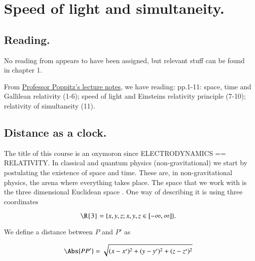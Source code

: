 %
%

\chapter{Speed of light and simultaneity.}
\label{chap:relativisticElectrodynamicsL1}
{}
\date{Jan 11, 2011}

\beginArtNoToc

\section{Reading.}

No reading from \citep{landau1980classical} appears to have been assigned, but relevant stuff can be found in chapter 1.

From \href{http://www.physics.utoronto.ca/~poppitz/epoppitz/PHY450_files/RelEMp1-11.pdf}{Professor Poppitz's lecture notes}, we have reading: pp.1-11: space, time and Gallilean relativity (1-6); speed of light and Einsteins relativity principle (7-10); relativity of simultaneity (11).

\section{Distance as a clock.}

The title of this course is an oxymoron since ELECTRODYNAMICS == RELATIVITY.  In classical and quantum physics (non-gravitational) we start by postulating the existence of space and time.  These are, in non-gravitational physics, the arena where everything takes place.  The space that we work with is the three dimensional Euclidean space .  One way of describing it is using three coordinates

\begin{equation}\label{eqn:relativisticElectrodynamicsL1:10}
\text{\R{3}} = \{ x, y, z ; x,y,z \in [-\infty,\infty] \}.
\end{equation}

We define a distance between $P$ and $P'$ as

\begin{equation}\label{eqn:relativisticElectrodynamicsL1:20}
\Abs{P P' } = \sqrt{ (x-x')^2 + (y-y')^2 + (z-z')^2 }
\end{equation}

